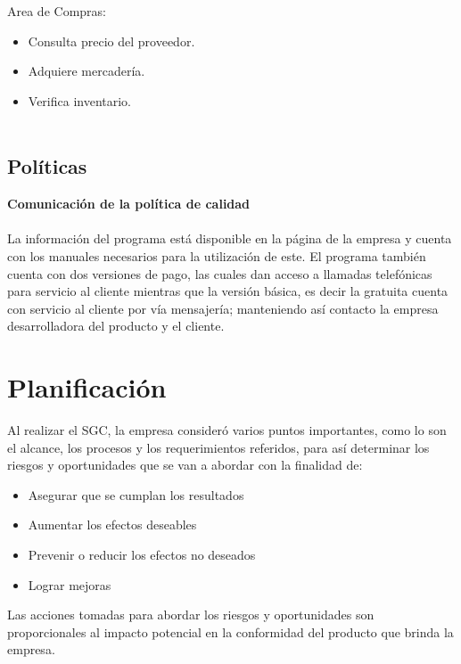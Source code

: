 \documentclass[12pt,a4paper]{article}
\begin{document}
Area de Compras:
\begin{itemize}
\item Consulta precio del proveedor.
\item Adquiere mercadería.
\item Verifica inventario.\\\\
\end{itemize}

\subsection{Políticas}
\textbf{Comunicación de la política de calidad}\\\\
La información del programa está disponible en la página de la empresa y cuenta con los manuales necesarios para la utilización de este.
El programa también cuenta con dos versiones de pago, las cuales dan acceso a llamadas telefónicas para servicio al cliente mientras que la versión básica, es decir la gratuita cuenta con servicio al cliente por vía mensajería; manteniendo así contacto la empresa desarrolladora del producto y el cliente.


\section{Planificación}\textbf{}
Al realizar el SGC, la empresa consideró varios puntos importantes, como lo son el alcance, los procesos y los requerimientos referidos, para así determinar los riesgos y oportunidades que se van a abordar con la finalidad de:
\begin{itemize}
\item Asegurar que se cumplan los resultados
\item Aumentar los efectos deseables
\item Prevenir o reducir los efectos no deseados
\item Lograr mejoras
\end{itemize}
Las acciones tomadas para abordar los riesgos y oportunidades son proporcionales al impacto potencial en la conformidad del producto que brinda la empresa.
\vspace{17cm}
\end{document}
